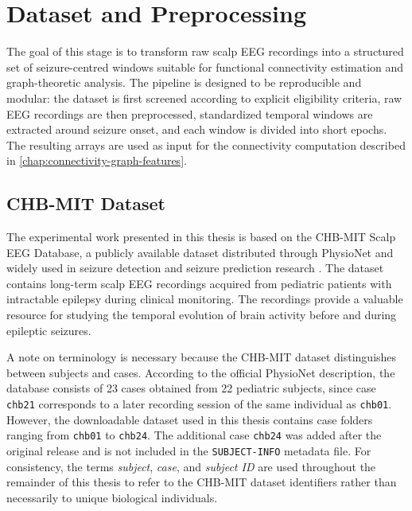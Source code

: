 \chapter{Dataset and Preprocessing}
\label{chap:dataset-preprocessing}

The goal of this stage is to transform raw scalp EEG recordings into a structured
set of seizure-centred windows suitable for functional connectivity estimation
and graph-theoretic analysis. The pipeline is designed to be reproducible and
modular: the dataset is first screened according to explicit eligibility
criteria, raw EEG recordings are then preprocessed, standardized temporal
windows are extracted around seizure onset, and each window is divided into
short epochs. The resulting arrays are used as input for the connectivity
computation described in \cref{chap:connectivity-graph-features}.

\section{CHB-MIT Dataset}
\label{sec:chbmit-dataset}

The experimental work presented in this thesis is based on the CHB-MIT Scalp
EEG Database, a publicly available dataset distributed through PhysioNet and
widely used in seizure detection and seizure prediction research
\cite{PhysioNet-chbmit-1.0.0}. The dataset contains long-term scalp EEG
recordings acquired from pediatric patients with intractable epilepsy during
clinical monitoring. The recordings provide a valuable resource for studying
the temporal evolution of brain activity before and during epileptic seizures.

A note on terminology is necessary because the CHB-MIT dataset distinguishes
between subjects and cases. According to the official PhysioNet description,
the database consists of \num{23} cases obtained from \num{22} pediatric
subjects, since case \texttt{chb21} corresponds to a later recording session of
the same individual as \texttt{chb01}. However, the downloadable dataset used
in this thesis contains case folders ranging from \texttt{chb01} to
\texttt{chb24}. The additional case \texttt{chb24} was added after the original
release and is not included in the \texttt{SUBJECT-INFO} metadata file. For
consistency, the terms \emph{subject}, \emph{case}, and \emph{subject ID} are
used throughout the remainder of this thesis to refer to the CHB-MIT dataset
identifiers rather than necessarily to unique biological individuals.

